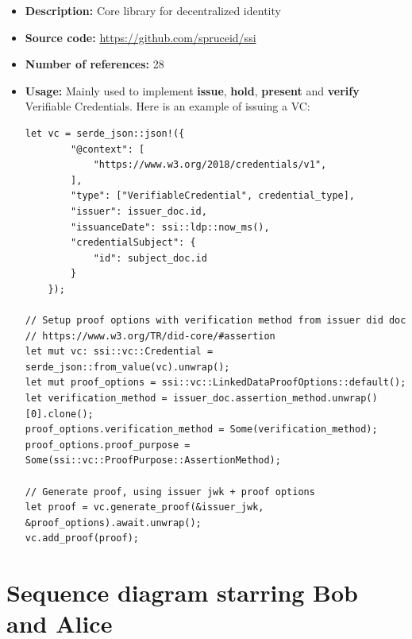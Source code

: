 \begin{itemize}
\item
  \textbf{Description:} Core library for decentralized identity
\item
  \textbf{Source code:} \url{https://github.com/spruceid/ssi}
\item
  \textbf{Number of references:} 28
\item
  \textbf{Usage:} Mainly used to implement \textbf{issue},
  \textbf{hold}, \textbf{present} and \textbf{verify} Verifiable
  Credentials. Here is an example of issuing a VC:

\begin{lstlisting}
let vc = serde_json::json!({
        "@context": [
            "https://www.w3.org/2018/credentials/v1",
        ],
        "type": ["VerifiableCredential", credential_type],
        "issuer": issuer_doc.id,
        "issuanceDate": ssi::ldp::now_ms(),
        "credentialSubject": {
            "id": subject_doc.id
        }
    });

// Setup proof options with verification method from issuer did doc 
// https://www.w3.org/TR/did-core/#assertion
let mut vc: ssi::vc::Credential = serde_json::from_value(vc).unwrap();
let mut proof_options = ssi::vc::LinkedDataProofOptions::default();
let verification_method = issuer_doc.assertion_method.unwrap()[0].clone();
proof_options.verification_method = Some(verification_method);
proof_options.proof_purpose = Some(ssi::vc::ProofPurpose::AssertionMethod);

// Generate proof, using issuer jwk + proof options
let proof = vc.generate_proof(&issuer_jwk, &proof_options).await.unwrap();
vc.add_proof(proof);
\end{lstlisting}
\end{itemize}

\hypertarget{sequence-diagram}{%
\section{Sequence diagram starring Bob and Alice}\label{sequence-diagram}}

